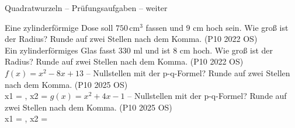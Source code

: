 \begin{aufgabe}{Quadratwurzeln – Prüfungsaufgaben – weiter}
\begin{teile}
\steil Eine zylinderförmige Dose soll $750\,\text{cm}^3$ fassen und $9$ cm hoch sein. Wie groß ist der Radius? Runde auf zwei Stellen nach dem Komma. \hfill (P10 2022 OS) \\ \leerfeld[cm]
\steil Ein zylinderförmiges Glas fasst $330$ ml und ist $8$ cm hoch. Wie groß ist der Radius? Runde auf zwei Stellen nach dem Komma. \hfill (P10 2022 OS) \\ \leerfeld[cm]
\steil $f(x) = x^2 - 8x + 13$ – Nullstellen mit der p-q-Formel? Runde auf zwei Stellen nach dem Komma. \hfill (P10 2025 OS) \\ x1 = \leerfeld , x2 = \leerfeld
\steil $g(x) = x^2 + 4x - 1$ – Nullstellen mit der p-q-Formel? Runde auf zwei Stellen nach dem Komma. \hfill (P10 2025 OS) \\ x1 = \leerfeld , x2 = \leerfeld
\end{teile}
\end{aufgabe}
